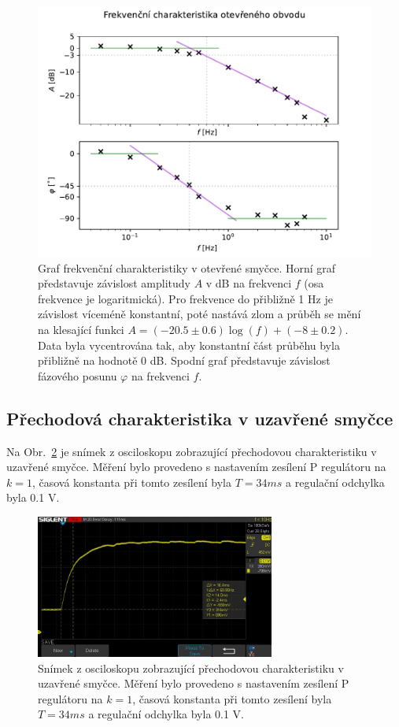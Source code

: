 		\begin{figure}[H] 
			\centering
			\includegraphics[scale=0.6]{img/graf_bode_otevrena.pdf} 
			\caption{Graf frekvenční charakteristiky v otevřené smyčce. Horní graf představuje závislost amplitudy $A$ v dB na frekvenci $f$ (osa frekvence je logaritmická). Pro frekvence do přibližně 1 Hz je závislost víceméně konstantní, poté nastává zlom a průběh se mění na klesající funkci $A=(-20.5\pm 0.6)\log(f)+(-8\pm 0.2)$. Data byla vycentrována tak, aby konstantní část průběhu byla přibližně na hodnotě 0 dB. Spodní graf představuje závislost fázového posunu $\varphi$ na frekvenci $f$.} 
			\label{fig:bode_otevrena}
		\end{figure}


	\subsection{Přechodová charakteristika v uzavřené smyčce}
		Na Obr.~\ref{fig:prechodova_uzavrena_k1} je snímek z osciloskopu zobrazující přechodovou charakteristiku v uzavřené smyčce. Měření bylo provedeno s nastavením zesílení P regulátoru na $k=1$, časová konstanta při tomto zesílení byla $T=34\unit{ms}$ a regulační odchylka byla 0.1 V.

		\begin{figure}[H] 
			\centering
			\includegraphics[width = 0.7\textwidth]{img/SDS00002.jpg} 
			\caption{Snímek z osciloskopu zobrazující přechodovou charakteristiku v uzavřené smyčce. Měření bylo provedeno s nastavením zesílení P regulátoru na $k=1$, časová konstanta při tomto zesílení byla $T=34\unit{ms}$ a regulační odchylka byla 0.1 V.} 
			\label{fig:prechodova_uzavrena_k1}
		\end{figure}	

